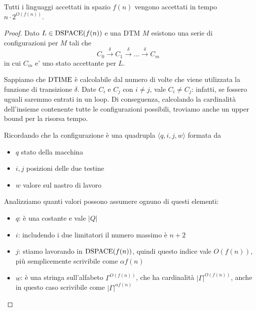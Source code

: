 \begin{theor}
	Tutti i linguaggi accettati in spazio $f(n)$ vengono accettati in tempo $n \cdot 2^{O(f(n))}$. 
\end{theor}
\begin{proof}
	Dato $L \in \text{DSPACE} (f(n))$ e una DTM $M$ esistono una serie di configurazioni per $M$ tali che
	$$ C_0 \xrightarrow{\delta} C_1 \xrightarrow{\delta} \dots \xrightarrow{\delta} C_m $$
	in cui $C_m$ e' uno stato accettante per $L$.
	
	Sappiamo che $\text{DTIME}$ è calcolabile dal numero di volte che viene utilizzata la funzione di transizione $\delta$. Date $C_i$ e $C_j$ con $i \neq j$, vale $C_i \neq C_j$: infatti, se fossero uguali saremmo entrati in un loop. Di conseguenza, calcolando la cardinalità dell'insieme contenente tutte le configurazioni possibili, troviamo anche un upper bound per la risorsa tempo.
	
	Ricordando che la configurazione è una quadrupla $\langle q, i, j, w \rangle$ formata da
	\begin{itemize}
		\item $q$ stato della macchina
		
        \item $i, j$ posizioni delle due testine
		
        \item $w$ valore sul nastro di lavoro
	\end{itemize}
	
	Analizziamo quanti valori possono assumere ognuno di questi elementi:
	\begin{itemize}
		\item $q$: è una costante e vale $|Q|$
		
        \item $i$: includendo i due limitatori il numero massimo è $n+2$ 
		
        \item $j$: stiamo lavorando in $\text{DSPACE} (f(n))$, quindi questo indice vale $O(f(n))$, più semplicemente scrivibile come $\alpha f(n)$
		
        \item $w$: è una stringa sull'alfabeto $\Gamma^{O(f(n))}$, che ha cardinalità $|\Gamma|^{O(f(n))}$, anche in questo caso scrivibile come $|\Gamma|^{\alpha f(n)}$
	\end{itemize}
	

\end{proof}
